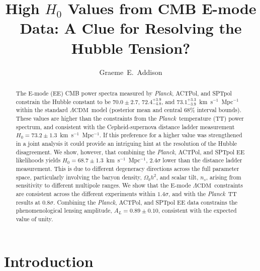 \documentclass[twocolumn]{aastex63}
\newcommand{\planck}{\textsl{Planck}}
\newcommand{\lcdm}{\ensuremath{\Lambda\mathrm{CDM}}}
\begin{document}
\title{High $H_0$ Values from CMB E-mode Data: A Clue for Resolving the Hubble Tension?}


\author[0000-0002-2147-2248]{Graeme~E.~Addison}


\begin{abstract}

\noindent
The E-mode (EE) CMB power spectra measured by \planck, ACTPol, and SPTpol constrain the Hubble constant to be $70.0\pm2.7$, $72.4^{+3.9}_{-4.8}$, and $73.1^{+3.3}_{-3.9}$~km~s$^{-1}$~Mpc$^{-1}$ within the standard \lcdm\ model (posterior mean and central 68\% interval bounds). These values are higher than the constraints from the \planck\ temperature (TT) power spectrum, and consistent with the Cepheid-supernova distance ladder measurement $H_0=73.2\pm1.3$~km~s$^{-1}$~Mpc$^{-1}$. If this preference for a higher value was strengthened in a joint analysis it could provide an intriguing hint at the resolution of the Hubble disagreement. We show, however, that combining the \planck, ACTPol, and SPTpol EE likelihoods yields $H_0=68.7\pm1.3$~km~s$^{-1}$~Mpc$^{-1}$, $2.4\sigma$ lower than the distance ladder measurement. This is due to different degeneracy directions across the full parameter space, particularly involving the baryon density, $\Omega_bh^2$, and scalar tilt, $n_s$, arising from sensitivity to different multipole ranges. We show that the E-mode \lcdm\ constraints are consistent across the different experiments within $1.4\sigma$, and with the \planck\ TT results at $0.8\sigma$. Combining the \planck, ACTPol, and SPTpol EE data constrains the phenomenological lensing amplitude, $A_L=0.89\pm0.10$, consistent with the expected value of unity.

\end{abstract}


\section{Introduction}
\label{sec:intro}
\end{document}
